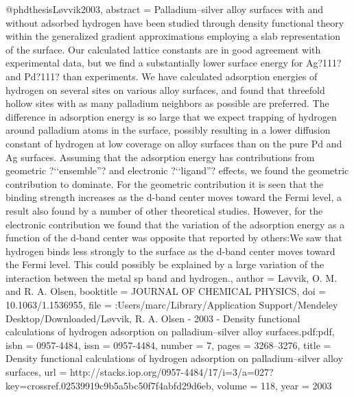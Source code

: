 @phdthesis{Løvvik2003,
abstract = {Palladium–silver alloy surfaces with and without adsorbed hydrogen have been studied through density functional theory within the generalized gradient approximations employing a slab representation of the surface. Our calculated lattice constants are in good agreement with experimental data, but we find a substantially lower surface energy for Ag?111? and Pd?111? than experiments. We have calculated adsorption energies of hydrogen on several sites on various alloy surfaces, and found that threefold hollow sites with as many palladium neighbors as possible are preferred. The difference in adsorption energy is so large that we expect trapping of hydrogen around palladium atoms in the surface, possibly resulting in a lower diffusion constant of hydrogen at low coverage on alloy surfaces than on the pure Pd and Ag surfaces. Assuming that the adsorption energy has contributions from geometric ?‘‘ensemble''? and electronic ?‘‘ligand''? effects, we found the geometric contribution to dominate. For the geometric contribution it is seen that the binding strength increases as the d-band center moves toward the Fermi level, a result also found by a number of other theoretical studies. However, for the electronic contribution we found that the variation of the adsorption energy as a function of the d-band center was opposite that reported by others:We saw that hydrogen binds less strongly to the surface as the d-band center moves toward the Fermi level. This could possibly be explained by a large variation of the interaction between the metal sp band and hydrogen.},
author = {L{\o}vvik, O. M. and {R. A. Olsen}},
booktitle = {JOURNAL OF CHEMICAL PHYSICS},
doi = {10.1063/1.1536955},
file = {:Users/marc/Library/Application Support/Mendeley Desktop/Downloaded/L{\o}vvik, R. A. Olsen - 2003 - Density functional calculations of hydrogen adsorption on palladium–silver alloy surfaces.pdf:pdf},
isbn = {0957-4484},
issn = {0957-4484},
number = {7},
pages = {3268--3276},
title = {{Density functional calculations of hydrogen adsorption on palladium–silver alloy surfaces}},
url = {http://stacks.iop.org/0957-4484/17/i=3/a=027?key=crossref.02539919c9b5a5bc50f7f4abfd29d6eb},
volume = {118},
year = {2003}
}
